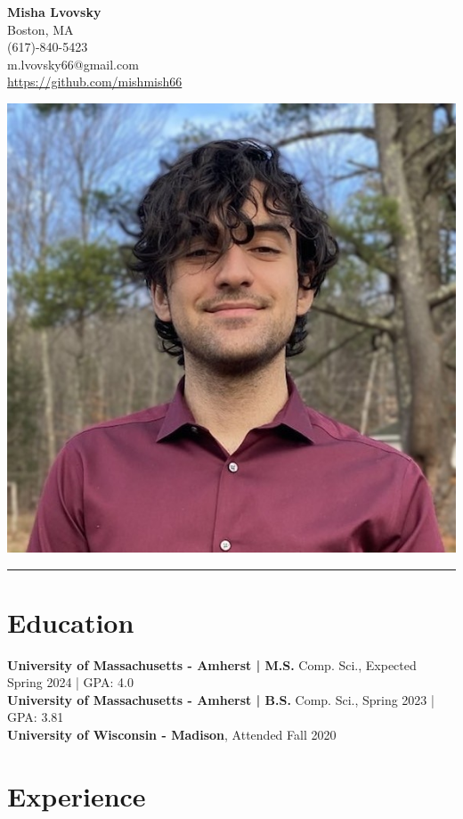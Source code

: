 \documentclass[letterpaper, 10pt]{article}
\begin{document}
\noindent
\begin{minipage}{.65\textwidth}
    \LARGE \textbf{Misha Lvovsky}\\
    \normalsize
    Boston, MA \\
    (617)-840-5423 \\
    m.lvovsky66@gmail.com \\
    \url{https://github.com/mishmish66}
\end{minipage}
\hfill
\begin{minipage}{.2\textwidth}
    \includegraphics[width=\linewidth]{portrait.jpg}
\end{minipage}
\noindent\rule{\textwidth}{0.5pt}

\section*{Education}
\noindent
\textbf{University of Massachusetts - Amherst | M.S.} Comp. Sci., Expected Spring 2024 | GPA: 4.0 \\
\textbf{University of Massachusetts - Amherst | B.S.} Comp. Sci., Spring 2023 | GPA: 3.81 \\
\textbf{University of Wisconsin - Madison}, Attended Fall 2020


\section*{Experience}
\end{document}
